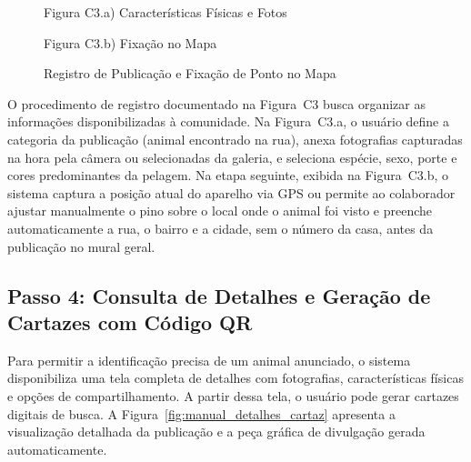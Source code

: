 \begin{figure}[H]
    \centering
    \caption{Registro de Publicação e Fixação de Ponto no Mapa}
    \label{fig:manual_cadastro_publicacao}
    \vspace{0.15cm}
    \begin{minipage}[t]{0.48\textwidth}
        \centering
        \par\vspace{0.12cm}
        {\small Figura C3.a) Características Físicas e Fotos}
    \end{minipage}
    \hfill
    \begin{minipage}[t]{0.48\textwidth}
        \centering
        \par\vspace{0.12cm}
        {\small Figura C3.b) Fixação no Mapa}
    \end{minipage}
    \par\vspace{0.1cm}
\end{figure}

O procedimento de registro documentado na Figura~C3 busca organizar as informações disponibilizadas à comunidade. Na Figura~C3.a, o usuário define a categoria da publicação (animal encontrado na rua), anexa fotografias capturadas na hora pela câmera ou selecionadas da galeria, e seleciona espécie, sexo, porte e cores predominantes da pelagem. Na etapa seguinte, exibida na Figura~C3.b, o sistema captura a posição atual do aparelho via GPS ou permite ao colaborador ajustar manualmente o pino sobre o local onde o animal foi visto e preenche automaticamente a rua, o bairro e a cidade, sem o número da casa, antes da publicação no mural geral.

\clearpage

\subsection*{Passo 4: Consulta de Detalhes e Geração de Cartazes com Código QR}
\noindent
Para permitir a identificação precisa de um animal anunciado, o sistema disponibiliza uma tela completa de detalhes com fotografias, características físicas e opções de compartilhamento. A partir dessa tela, o usuário pode gerar cartazes digitais de busca. A Figura~\ref{fig:manual_detalhes_cartaz} apresenta a visualização detalhada da publicação e a peça gráfica de divulgação gerada automaticamente.

